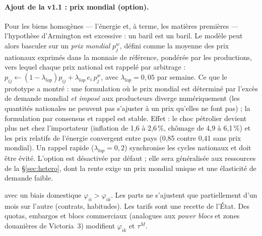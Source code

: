 \documentclass[11pt,a4paper]{article}
\begin{document}
\begin{lecture}
\paragraph{Ajout de la v1.1 : prix mondial (option).} Pour les biens homogènes — l'énergie et, à terme, les matières premières — l'hypothèse d'Armington est excessive : un baril est un baril. Le modèle peut alors basculer sur un \emph{prix mondial} $p^w_j$, défini comme la moyenne des prix nationaux exprimés dans la monnaie de référence, pondérée par les productions, vers lequel chaque prix national est rappelé par arbitrage : $p_{ij}\leftarrow(1-\lambda_{lop})p_{ij}+\lambda_{lop}\,e_i\,p^w_j$, avec $\lambda_{lop}=0{,}05$ par semaine. Ce que le prototype a montré : une formulation où le prix mondial est déterminé par l'excès de demande mondial \emph{et imposé} aux producteurs diverge numériquement (les quantités nationales ne peuvent pas s'ajuster à un prix qu'elles ne font pas) ; la formulation par consensus et rappel est stable. Effet : le choc pétrolier devient plus net chez l'importateur (inflation de 1,6 à 2,6\,\%, chômage de 4,9 à 6,1\,\%) et les prix relatifs de l'énergie convergent entre pays (0,85 contre 0,41 sans prix mondial). Un rappel rapide ($\lambda_{lop}=0{,}2$) synchronise les cycles nationaux et doit être évité. L'option est désactivée par défaut ; elle sera généralisée aux ressources de la \S\ref{sec:hetero}, dont la rente exige un prix mondial unique et une élasticité de demande faible.
\end{lecture}
avec un biais domestique $\varphi_{ii} > \varphi_{ik}$. Les parts ne s'ajustent que partiellement d'un mois sur l'autre (contrats, habitudes). Les tarifs sont une recette de l'État. Des quotas, embargos et blocs commerciaux (analogues aux \emph{power blocs} et zones douanières de Victoria~3) modifient $\varphi_{ik}$ et $\tau^M$.
\end{document}
